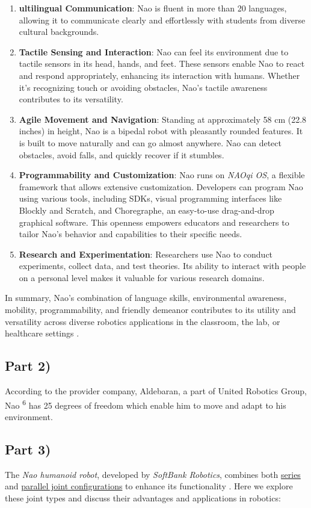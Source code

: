 \documentclass[conference]{IEEEtran}
\begin{document}
\begin{enumerate}
    \item \textbf{ultilingual Communication}: Nao is fluent in more than 20 languages, allowing it to communicate clearly and effortlessly with students from diverse cultural backgrounds.
    \item \textbf{Tactile Sensing and Interaction}: Nao can feel its environment due to tactile sensors in its head, hands, and feet. These sensors enable Nao to react and respond appropriately, enhancing its interaction with humans. Whether it's recognizing touch or avoiding obstacles, Nao's tactile awareness contributes to its versatility.
    \item \textbf{Agile Movement and Navigation}: Standing at approximately 58 cm (22.8 inches) in height, Nao is a bipedal robot with pleasantly rounded features. It is built to move naturally and can go almost anywhere. Nao can detect obstacles, avoid falls, and quickly recover if it stumbles.
    \item \textbf{Programmability and Customization}: Nao runs on \textit{NAOqi OS}, a flexible framework that allows extensive customization. Developers can program Nao using various tools, including SDKs, visual programming interfaces like Blockly and Scratch, and Choregraphe, an easy-to-use drag-and-drop graphical software. This openness empowers educators and researchers to tailor Nao's behavior and capabilities to their specific needs.
    \item \textbf{Research and Experimentation}: Researchers use Nao to conduct experiments, collect data, and test theories. Its ability to interact with people on a personal level makes it valuable for various research domains.
\end{enumerate}


In summary, Nao's combination of language skills, environmental awareness, mobility, programmability, and friendly demeanor contributes to its utility and versatility across diverse robotics applications in the classroom, the lab, or healthcare settings \cite{b8}.

\subsection*{Part 2)}
According to the provider company, Aldebaran, a part of United Robotics Group, Nao \textsuperscript{6} has 25 degrees of freedom which enable him to move and adapt to his environment.

\subsection*{Part 3)}
The \textit{Nao humanoid robot}, developed by \textit{SoftBank Robotics}, combines both \underline{series} and \underline{parallel joint configurations} to enhance its functionality \cite{b9}. Here we explore these joint types and discuss their advantages and applications in robotics:
\end{document}
